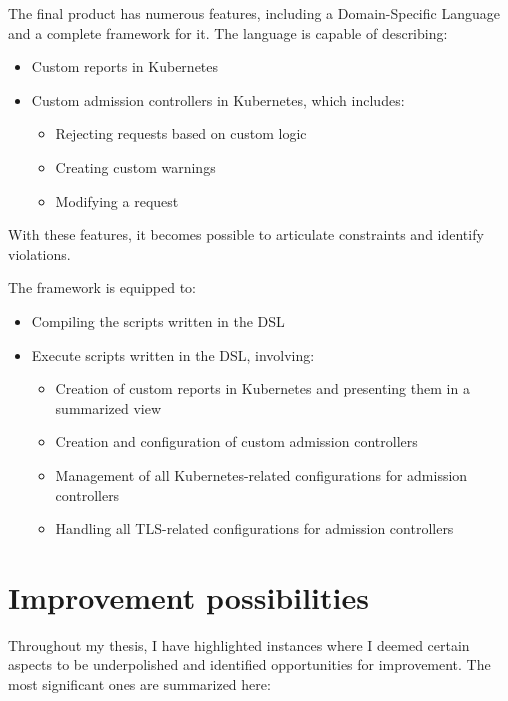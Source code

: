 The final product has numerous features, including a Domain-Specific Language and a complete framework for it. The language is capable of describing:

\begin{itemize}
    \item Custom reports in Kubernetes
    \item Custom admission controllers in Kubernetes, which includes:
    \begin{itemize}
    \item Rejecting requests based on custom logic
    \item Creating custom warnings
    \item Modifying a request
    \end{itemize}
\end{itemize}

With these features, it becomes possible to articulate constraints and identify violations.

The framework is equipped to:

\begin{itemize}
    \item Compiling the scripts written in the DSL
    \item Execute scripts written in the DSL, involving:
    \begin{itemize}
    \item Creation of custom reports in Kubernetes and presenting them in a summarized view
    \item Creation and configuration of custom admission controllers
    \item Management of all Kubernetes-related configurations for admission controllers
    \item Handling all TLS-related configurations for admission controllers
    \end{itemize}
\end{itemize}

\section{Improvement possibilities}

Throughout my thesis, I have highlighted instances where I deemed certain aspects to be underpolished and identified opportunities for improvement. The most significant ones are summarized here:

